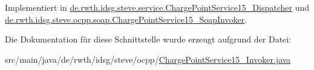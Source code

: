 Implementiert in \hyperlink{classde_1_1rwth_1_1idsg_1_1steve_1_1service_1_1_charge_point_service15___dispatcher_a795a1aa4bb5733b36d280862e910d5fd}{de.\-rwth.\-idsg.\-steve.\-service.\-Charge\-Point\-Service15\-\_\-\-Dispatcher} und \hyperlink{classde_1_1rwth_1_1idsg_1_1steve_1_1ocpp_1_1soap_1_1_charge_point_service15___soap_invoker_a7a80cacd445a2d5da5c26cad7cfc0741}{de.\-rwth.\-idsg.\-steve.\-ocpp.\-soap.\-Charge\-Point\-Service15\-\_\-\-Soap\-Invoker}.



Die Dokumentation für diese Schnittstelle wurde erzeugt aufgrund der Datei\-:\begin{DoxyCompactItemize}
\item 
src/main/java/de/rwth/idsg/steve/ocpp/\hyperlink{_charge_point_service15___invoker_8java}{Charge\-Point\-Service15\-\_\-\-Invoker.\-java}\end{DoxyCompactItemize}
